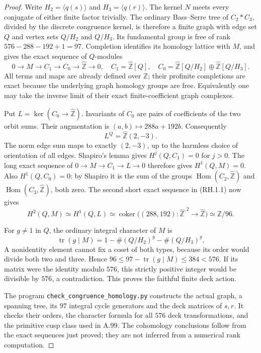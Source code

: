 \begin{proof}
Write $H_2=\langle q(s)\rangle$ and $H_3=\langle q(r)\rangle$.
The kernel $N$ meets every conjugate of either finite factor
trivially.  The ordinary Bass--Serre tree of $C_2*C_3$, divided
by the discrete congruence kernel, is therefore a finite graph
with edge set $Q$ and vertex sets $Q/H_2$ and $Q/H_3$.
Its fundamental group is free of rank
$576-288-192+1=97$.  Completion identifies its homology lattice
with $M$, and gives the exact sequence of $Q$-modules
\[
 0\longrightarrow M\longrightarrow C_1\longrightarrow C_0
       \longrightarrow\widehat{\mathbb Z}\longrightarrow0,
 \quad
 C_1=\widehat{\mathbb Z}[Q],\quad
 C_0=\widehat{\mathbb Z}[Q/H_2]\oplus
                \widehat{\mathbb Z}[Q/H_3].
 \tag{RH.1.1}
\]
All terms and maps are already defined over $\mathbb Z$; their
profinite completions are exact because the underlying graph
homology groups are free.  Equivalently one may take the inverse
limit of their exact finite-coefficient graph complexes.

Put $L=\ker(C_0\to\widehat{\mathbb Z})$.  Invariants of $C_0$
are pairs of coefficients of the two orbit sums. Their
augmentation is $(a,b)\mapsto288a+192b$. Consequently
\[
 L^Q=\widehat{\mathbb Z}(2,-3).
\]
The norm edge sum maps to exactly $(2,-3)$, up to the harmless
choice of orientation of all edges.  Shapiro's lemma gives
$H^j(Q,C_1)=0$ for $j>0$.  The long exact sequence of
$0\to M\to C_1\to L\to0$ therefore gives $H^1(Q,M)=0$.
Also $H^1(Q,C_0)=0$: by Shapiro it is the sum of the groups
$\operatorname{Hom}(C_2,\widehat{\mathbb Z})$ and
$\operatorname{Hom}(C_3,\widehat{\mathbb Z})$, both zero.
The second short exact sequence in (RH.1.1) now gives
\[
 H^2(Q,M)\simeq H^1(Q,L)
  \simeq\operatorname{coker}
   \bigl((288,192):\widehat{\mathbb Z}^{,2}
                     \to\widehat{\mathbb Z}\bigr)
  \simeq\mathbb Z/96.
\]

For $g\ne1$ in $Q$, the ordinary integral character of $M$ is
\[
 \operatorname{tr}(g\mid M)
       =1-\#(Q/H_2)^g-\#(Q/H_3)^g.
 \tag{RH.1.2}
\]
A nonidentity element cannot fix a coset of both types, because
its order would divide both two and three. Hence
$96\leq97-\operatorname{tr}(g\mid M)\leq384<576$.
If its matrix were the identity modulo $576$, this strictly
positive integer would be divisible by $576$, a contradiction.
This proves the faithful finite deck action.

The program \texttt{check\_congruence\_homology.py} constructs
the actual graph, a spanning tree, its $97$ integral cycle
generators and the deck matrices of $s,r$.  It checks their
orders, the character formula for all $576$ deck transformations,
and the primitive cusp class used in A.99.  The cohomology
conclusions follow from the exact sequences just proved; they
are not inferred from a numerical rank computation.
\end{proof}

